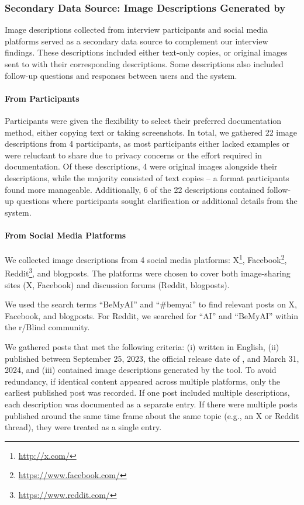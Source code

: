 \subsubsection{Secondary Data Source: Image Descriptions Generated by \bma}
Image descriptions collected from interview participants and social media platforms served as a secondary data source to complement our interview findings. These descriptions included either text-only copies, or original images sent to \sbma{} with their corresponding descriptions. Some descriptions also included follow-up questions and responses between users and the system.


\paragraph{From Participants}


Participants were given the flexibility to select their preferred documentation method, either copying text or taking screenshots. 
% 
In total, we gathered 22 image descriptions from 4 participants, as most participants either lacked examples or were reluctant to share due to privacy concerns or the effort required in documentation.
Of these descriptions, 4 were original images alongside their descriptions, while the majority consisted of text copies -- a format participants found more manageable. 
Additionally, 6 of the 22 descriptions contained follow-up questions where participants sought clarification or additional details from the system. 





\paragraph{From Social Media Platforms}

We collected image descriptions from 4 social media platforms: X\footnote{\url{http://x.com/}}, Facebook\footnote{\url{https://www.facebook.com/}}, Reddit\footnote{\url{https://www.reddit.com/}}, and blogposts. The platforms were chosen to cover both image-sharing sites (X, Facebook) and discussion forums (Reddit, blogposts).



We used the search terms ``BeMyAI'' and ``\#bemyai'' to find relevant posts on X, Facebook, and blogposts. For Reddit, we searched for ``AI'' and ``BeMyAI'' within the r/Blind community. 



We gathered posts that met the following criteria: (i) written in English, (ii) published between September 25, 2023, the official release date of \bma, and March 31, 2024, and (iii) contained image descriptions generated by the tool. 
% 
To avoid redundancy, if identical content appeared across multiple platforms, only the earliest published post was recorded. 
If one post included multiple descriptions, each description was documented as a separate entry. 
If there were multiple posts published around the same time frame about the same topic (e.g., an X or Reddit thread), they were treated as a single entry. 



